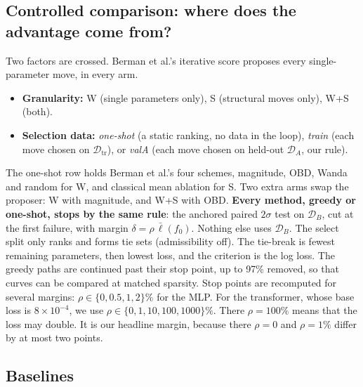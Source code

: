 \documentclass[11pt,a4paper]{article}
\theoremstyle{definition}
\newcommand{\D}{\mathcal{D}}
\newcommand{\Dtr}{\D_{\mathrm{tr}}}
\newcommand{\DA}{\D_{A}}
\newcommand{\DB}{\D_{B}}
\newcommand{\WS}{\textsf{W+S}}
\newcommand{\Wo}{\textsf{W}}
\newcommand{\So}{\textsf{S}}
\begin{document}
\subsection{Controlled comparison: where does the advantage come from?}
\label{sec:fair}

Two factors are crossed. Berman et al.'s iterative score proposes every
single-parameter move, in every arm.
\begin{itemize}
\item \textbf{Granularity:} \Wo{} (single parameters only), \So{} (structural moves only),
\WS{} (both).
\item \textbf{Selection data:} \emph{one-shot} (a static ranking, no data in the loop),
\emph{train} (each move chosen on $\Dtr$), or \emph{valA} (each move chosen on held-out
$\DA$, our rule).
\end{itemize}
The one-shot row holds Berman et al.'s four schemes, magnitude, OBD, Wanda and random
for \Wo, and classical mean ablation for \So. Two extra arms swap the proposer:
\Wo{} with magnitude, and \WS{} with OBD. \textbf{Every method, greedy or one-shot,
stops by the same rule}: the anchored paired $2\sigma$ test on $\DB$, cut at the first
failure, with margin $\delta=\rho\,\bar\ell(f_0)$. Nothing else uses $\DB$. The select
split only ranks and forms tie sets (admissibility off). The tie-break is fewest
remaining parameters, then lowest loss, and the criterion is the log loss. The greedy
paths are continued past their stop point, up to 97\% removed, so that curves can be
compared at matched sparsity. Stop points are recomputed for several margins: $\rho\in
\{0,0.5,1,2\}\%$ for the MLP. For the transformer, whose base loss is
$8\times10^{-4}$, we use $\rho\in\{0,1,10,100,1000\}\%$. There $\rho=100\%$ means that
the loss may double. It is our headline margin, because there $\rho=0$ and $\rho=1\%$ differ by at most two
points.

\subsection{Baselines}
\label{sec:baselines}
\end{document}
